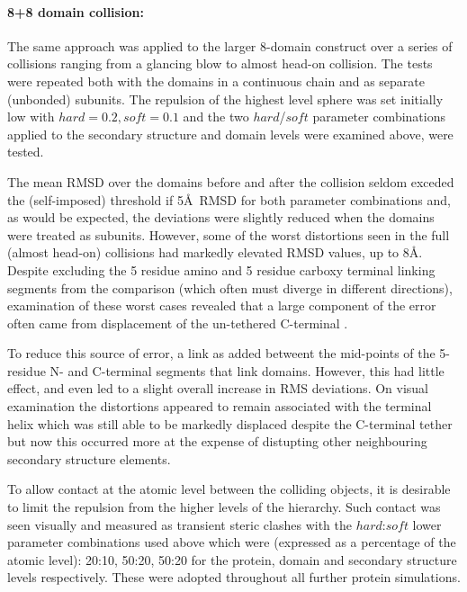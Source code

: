 \paragraph{8+8 domain collision:\\}

The same approach was applied to the larger 8-domain construct over a series of collisions 
ranging from a glancing blow to almost head-on collision.  The tests were repeated
both with the domains in a continuous chain and as separate (unbonded) subunits.
The repulsion of the highest level sphere was set initially low with $hard=0.2, soft=0.1$
and the two $hard$/$soft$ parameter combinations applied to the secondary structure and domain 
levels were examined above, were tested.

The mean RMSD over the domains before and after the collision seldom exceded the (self-imposed)
threshold if 5\AA\ RMSD for both parameter combinations and, as would be expected, the deviations
were slightly reduced when the domains were treated as subunits.   However, some of the worst
distortions seen in the full (almost head-on) collisions had markedly elevated RMSD values, up to 8\AA.
Despite excluding the 5 residue amino and 5 residue carboxy terminal linking segments from the comparison
(which often must diverge in different directions), examination of these worst cases revealed that a
large component of the error often came from displacement of the un-tethered C-terminal \AH.

To reduce this source of error, a link as added betweent the mid-points of the 5-residue N- and C-terminal
segments that link domains.  However, this had little effect, and even led to a slight overall increase in RMS
deviations.   On visual examination the distortions appeared to remain associated with the terminal helix
which was still able to be markedly displaced despite the C-terminal tether but now this occurred more
at the expense of distupting other neighbouring secondary structure elements.

To allow contact at the atomic level between the colliding objects,
it is desirable to limit the repulsion from the higher levels of the hierarchy.
Such contact was seen visually and measured as transient steric clashes with the $hard$:$soft$
lower parameter combinations used above which were (expressed as a percentage of the atomic level): 
20:10, 50:20, 50:20 for the protein, domain and secondary structure levels respectively.
These were adopted throughout all further protein simulations.

